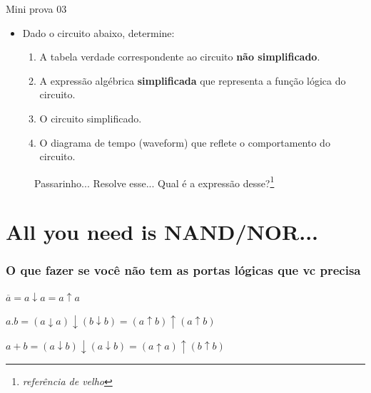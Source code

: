 \begin{frame}{Mini prova 03}
	\begin{itemize}
		\item Dado o circuito abaixo, determine:
		\begin{enumerate}
			\item A tabela verdade correspondente ao circuito \textbf{não simplificado}.
			\item A expressão algébrica \textbf{simplificada} que representa a função lógica do circuito.
			\item O circuito simplificado.
			\item O diagrama de tempo (waveform) que reflete o comportamento do circuito.
		\end{enumerate}
	\end{itemize}
	\begin{figure}
		\centering
		
		\caption{Passarinho... Resolve esse... Qual é a expressão desse?\footnote[frame]{\textit{referência de velho}}}
		\label{fig:05exe}
	\end{figure}
\end{frame}

\section{\musEighth All you need is NAND/NOR... \musEighth}

\begin{frame}
	\frametitle{O que fazer se você não tem as portas lógicas que vc precisa}
	\par $\overline{a} = a\downarrow a = a \uparrow a$
	\begin{figure}
		\centering
		
		\label{fig:nandnot}
	\end{figure}
	
	\par $a.b = (a \downarrow a)\downarrow(b\downarrow b) = (a\uparrow b)\uparrow(a\uparrow b)$
	\begin{figure}
		\centering
		
		\label{fig:nandand}
	\end{figure}
	
	\par $a+b=(a \downarrow b)\downarrow(a \downarrow b)=(a \uparrow a)\uparrow(b \uparrow b)$
	\begin{figure}
		\centering
		
		\label{fig:nandor}
	\end{figure}
\end{frame}


